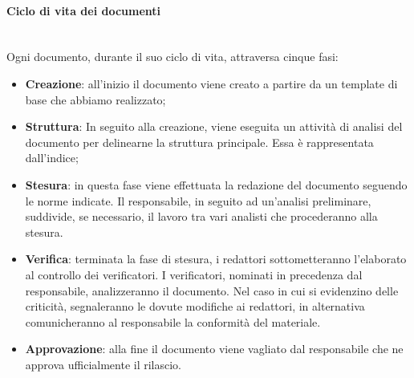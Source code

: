         \paragraph{Ciclo di vita dei documenti}\mbox{}\\ [1mm]
            Ogni documento, durante il suo ciclo di vita, attraversa cinque fasi:
            \begin{itemize}
            	\item \textbf{Creazione}: all'inizio il documento viene creato a partire da un template di base che abbiamo realizzato;
            	\item \textbf{Struttura}: In seguito alla creazione, viene eseguita un attività di analisi del documento per delinearne la struttura principale. Essa è rappresentata dall'indice;
                \item \textbf{Stesura}: in questa fase viene effettuata la redazione del documento seguendo le norme indicate. Il responsabile, in seguito ad un'analisi preliminare, suddivide, se necessario, il lavoro tra vari analisti che procederanno alla stesura.
                \item \textbf{Verifica}: terminata la fase di stesura, i redattori sottometteranno l'elaborato al controllo dei verificatori. I verificatori, 
                                         nominati in precedenza dal responsabile, analizzeranno il documento. Nel caso in cui si evidenzino delle criticità,
                                         segnaleranno le dovute modifiche ai redattori, in alternativa comunicheranno al responsabile la conformità del materiale.
                \item \textbf{Approvazione}: alla fine il documento viene vagliato dal responsabile che ne approva ufficialmente il rilascio.
            \end{itemize}
